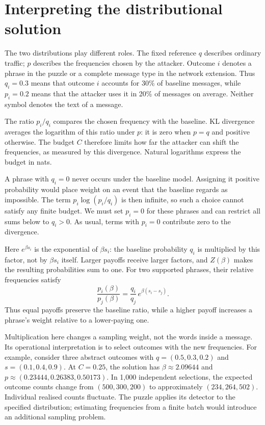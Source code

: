 \documentclass[11pt,a4paper]{article}
\begin{document}
\section{Interpreting the distributional solution}\label{app:interpretation}
The two distributions play different roles. The fixed reference $q$
describes ordinary traffic; $p$ describes the frequencies chosen by the
attacker. Outcome $i$ denotes a phrase in the puzzle or a complete message
type in the network extension. Thus $q_i=0.3$ means that outcome $i$
accounts for 30\% of baseline messages, while $p_i=0.2$ means that the
attacker uses it in 20\% of
messages on average. Neither symbol denotes the text of a message.

The ratio $p_i/q_i$ compares the chosen frequency with the baseline.
KL divergence averages the logarithm of this ratio under $p$: it is zero
when $p=q$ and positive otherwise. The budget $C$ therefore limits how
far the attacker can shift the frequencies, as measured by this divergence.
Natural logarithms express the budget in nats.

A phrase with $q_i=0$ never occurs under the baseline model. Assigning it
positive probability would place weight on an event that the baseline
regards as impossible. The term $p_i\log(p_i/q_i)$ is then infinite, so
such a choice cannot satisfy any finite budget. We must set $p_i=0$ for
these phrases and can restrict all sums below to $q_i>0$. As usual,
terms with $p_i=0$ contribute zero to the divergence.

Here $e^{\beta s_i}$ is the exponential of $\beta s_i$: the baseline
probability $q_i$ is multiplied by this factor, not by $\beta s_i$ itself.
Larger payoffs receive larger factors, and $Z(\beta)$ makes the resulting
probabilities sum to one. For two supported phrases, their relative
frequencies satisfy
\[
 \frac{p_i(\beta)}{p_j(\beta)}
 =\frac{q_i}{q_j}\,e^{\beta(s_i-s_j)}.
\]
Thus equal payoffs preserve the baseline ratio, while a higher payoff
increases a phrase's weight relative to a lower-paying one.

Multiplication here changes a sampling weight, not the words inside a
message. Its operational interpretation is to select outcomes
with the new frequencies. For example, consider three abstract outcomes
with $q=(0.5,0.3,0.2)$ and $s=(0.1,0.4,0.9)$. At $C=0.25$,
the solution has $\beta\approx2.09644$ and
$p\approx(0.23444,0.26383,0.50173)$. In 1,000 independent selections,
the expected outcome counts change from $(500,300,200)$ to approximately
$(234,264,502)$. Individual realised counts fluctuate. The puzzle applies
its detector to the specified distribution; estimating frequencies from
a finite batch would introduce an additional sampling problem.
\end{document}
